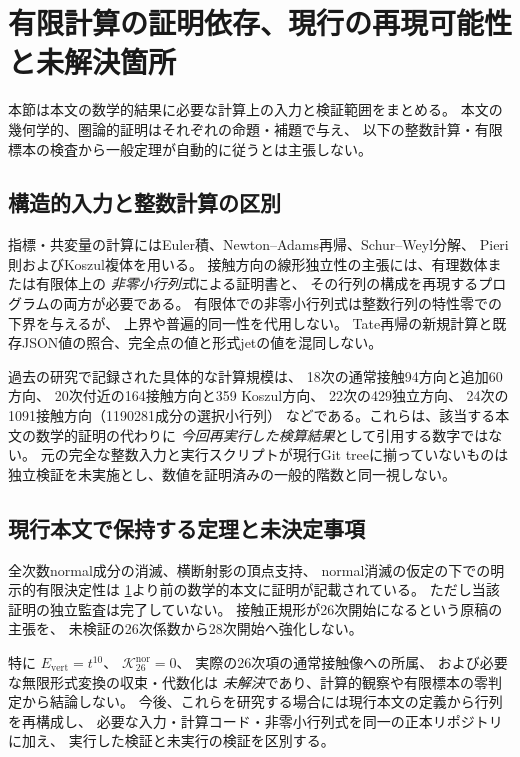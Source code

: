 \section{有限計算の証明依存、現行の再現可能性と未解決箇所}
\label{sec:finite-calculation-scope}

本節は本文の数学的結果に必要な計算上の入力と検証範囲をまとめる。
本文の幾何学的、圏論的証明はそれぞれの命題・補題で与え、
以下の整数計算・有限標本の検査から一般定理が自動的に従うとは主張しない。

\subsection{構造的入力と整数計算の区別}
指標・共変量の計算にはEuler積、Newton--Adams再帰、Schur--Weyl分解、
Pieri則およびKoszul複体を用いる。
接触方向の線形独立性の主張には、有理数体または有限体上の
\emph{非零小行列式}による証明書と、
その行列の構成を再現するプログラムの両方が必要である。
有限体での非零小行列式は整数行列の特性零での下界を与えるが、
上界や普遍的同一性を代用しない。
Tate再帰の新規計算と既存JSON値の照合、完全点の値と形式jetの値を混同しない。

過去の研究で記録された具体的な計算規模は、
18次の通常接触94方向と追加60方向、
20次付近の164接触方向と359 Koszul方向、
22次の429独立方向、
24次の1091接触方向（1190281成分の選択小行列）
などである。これらは、該当する本文の数学的証明の代わりに
\emph{今回再実行した検算結果}として引用する数字ではない。
元の完全な整数入力と実行スクリプトが現行Git treeに揃っていないものは
独立検証を未実施とし、数値を証明済みの一般的階数と同一視しない。

\subsection{現行本文で保持する定理と未決定事項}
全次数normal成分の消滅、横断射影の頂点支持、
normal消滅の仮定の下での明示的有限決定性は
\ref{sec:finite-calculation-scope}より前の数学的本文に証明が記載されている。
ただし当該証明の独立監査は完了していない。
接触正規形が26次開始になるという原稿の主張を、
未検証の26次係数から28次開始へ強化しない。

特に $E_{\mathrm{vert}}=t^{10}$、
$\mathcal K_{26}^{\mathrm{nor}}=0$、
実際の26次項の通常接触像への所属、
および必要な無限形式変換の収束・代数化は
\emph{未解決}であり、計算的観察や有限標本の零判定から結論しない。
今後、これらを研究する場合には現行本文の定義から行列を再構成し、
必要な入力・計算コード・非零小行列式を同一の正本リポジトリに加え、
実行した検証と未実行の検証を区別する。

